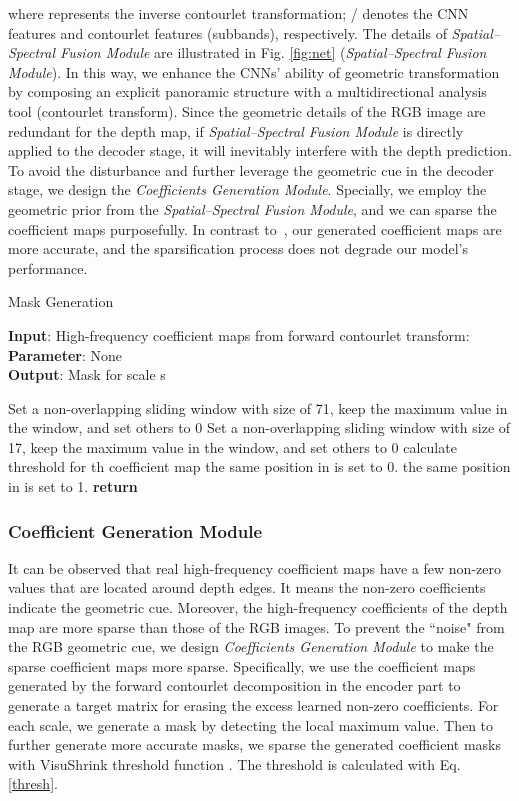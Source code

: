 \documentclass[10pt,times,mathptm,psfig,twocolumn,journals]{IEEEtran}
\begin{document}
where  represents the inverse contourlet transformation; / denotes the CNN features and contourlet features (subbands), respectively. The details of \textit{Spatial–Spectral Fusion Module} are illustrated in Fig. \ref{fig:net} (\textit{Spatial–Spectral Fusion Module}). In this way, we enhance the CNNs' ability of geometric transformation by composing an explicit panoramic structure with a multidirectional analysis tool (contourlet transform). Since the geometric details of the RGB image are redundant for the depth map, if \textit{Spatial–Spectral Fusion Module} is directly applied to the decoder stage, it will inevitably interfere with the depth prediction. To avoid the disturbance and further leverage the geometric cue in the decoder stage, we design the \textit{Coefficients Generation Module}. Specially, we employ the geometric prior from the \textit{Spatial–Spectral Fusion Module}, and we can sparse the coefficient maps purposefully. In contrast to~\cite{ramamonjisoa2021single}, our generated coefficient maps are more accurate, and the sparsification process does not degrade our model’s performance. \begin{algorithm}[tb]
\caption{Mask Generation}
\label{alg:algorithm}
\textbf{Input}: High-frequency coefficient maps from forward contourlet transform: \\
\textbf{Parameter}: None\\
\textbf{Output}: Mask  for scale s
\begin{algorithmic}[1] \STATE Set a non-overlapping sliding window with size of 71,
\STATE    keep the maximum value in the window, and set others to 0
\ENDFOR
\STATE Set a non-overlapping sliding window with size of 17,
\STATE    keep the maximum value in the window, and set others to 0
\ENDFOR
\STATE  calculate threshold for  th coefficient map
\STATE the same position in  is set to 0.
\ELSE
\STATE the same position in  is set to 1.
\ENDIF
\ENDFOR
\STATE \textbf{return} 
\end{algorithmic}
\end{algorithm}
\subsubsection{Coefficient Generation Module}
\label{CGM}
It can be observed that real high-frequency coefficient maps have a few non-zero values that are located around depth edges. It means the non-zero coefficients indicate the geometric cue. 
Moreover, the high-frequency coefficients of the depth map are more sparse than those of the RGB images. To prevent the ``noise" from the RGB geometric cue, we design \textit{Coefficients Generation Module} to make the sparse coefficient maps more sparse.
Specifically, we use the coefficient maps generated by the forward contourlet decomposition in the encoder part to generate a target matrix for erasing the excess learned non-zero coefficients. For each scale, we generate a mask by detecting the local maximum value. Then to further generate more accurate masks, we sparse the generated coefficient masks with VisuShrink threshold function \cite{zhao2016scanner}. The threshold  is calculated with Eq. \ref{thresh}.
\end{document}
